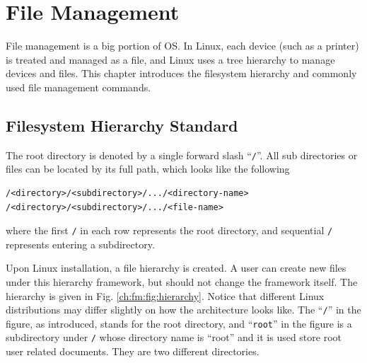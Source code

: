 \chapter{File Management} \label{ch:fm}

File management is a big portion of OS. In Linux, each device (such as a printer) is treated and managed as a file, and Linux uses a tree hierarchy to manage devices and files. This chapter introduces the filesystem hierarchy and commonly used file management commands.

\section{Filesystem Hierarchy Standard} \label{ch:fm:sec:hierarchy}

The root directory is denoted by a single forward slash ``\verb|/|''. All sub directories or files can be located by its full path, which looks like the following
\begin{lstlisting}
/<directory>/<subdirectory>/.../<directory-name>
/<directory>/<subdirectory>/.../<file-name>
\end{lstlisting}
where the first \verb|/| in each row represents the root directory, and sequential \verb|/| represents entering a subdirectory.

Upon Linux installation, a file hierarchy is created. A user can create new files under this hierarchy framework, but should not change the framework itself. The hierarchy is given in Fig. \ref{ch:fm:fig:hierarchy}. Notice that different Linux distributions may differ slightly on how the architecture looks like. The ``\verb|/|'' in the figure, as introduced, stands for the root directory, and ``\verb|root|'' in the figure is a subdirectory under \verb|/| whose directory name is ``root'' and it is used store root user related documents. They are two different directories.


